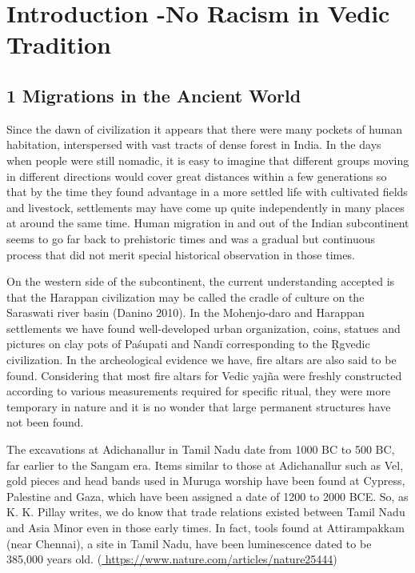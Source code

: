 
\chapter{Introduction -\break No Racism in Vedic Tradition}\label{intro}



\section*{1 Migrations in the Ancient World}

Since the dawn of civilization it appears that there were many pockets of human habitation, interspersed with vast tracts of dense forest in India. In the days when people were still nomadic, it is easy to imagine that different groups moving in different directions would cover great distances within a few generations so that by the time they found advantage in a more settled life with cultivated fields and livestock, settlements may have come up quite independently in many places at around the same time. Human migration in and out of the Indian subcontinent seems to go far back to prehistoric times and was a gradual but continuous process that did not merit special historical observation in those times.

On the western side of the subcontinent, the current understanding accepted is that the Harappan civilization may be called the cradle of culture on the Saraswati river basin (Danino 2010). In the Mohenjo-daro and Harappan settlements we have found well-developed urban organization, coins, statues and pictures on clay pots of Paśupati and Nandī corresponding to the Ṛgvedic civilization. In the archeological evidence we have, fire altars are also said to be found. Considering that most fire altars for Vedic yajña were freshly constructed according to various measurements required for specific ritual, they were more temporary in nature and it is no wonder that large permanent structures have not been found.

\newpage

The excavations at Adichanallur in Tamil Nadu date from 1000 BC to 500 BC, far earlier to the Sangam era. Items similar to those at Adichanallur such as Vel, gold pieces and head bands used in Muruga worship have been found at Cypress, Palestine and Gaza, which have been assigned a date of 1200 to 2000 BCE. So, as K. K. Pillay writes, we do know that trade relations existed between Tamil Nadu and Asia Minor even in those early times. In fact, tools found at Attirampakkam (near Chennai), a site in Tamil Nadu, have been luminescence dated to be 385,000 years old. (\url{ https://www.nature.com/articles/nature25444})

